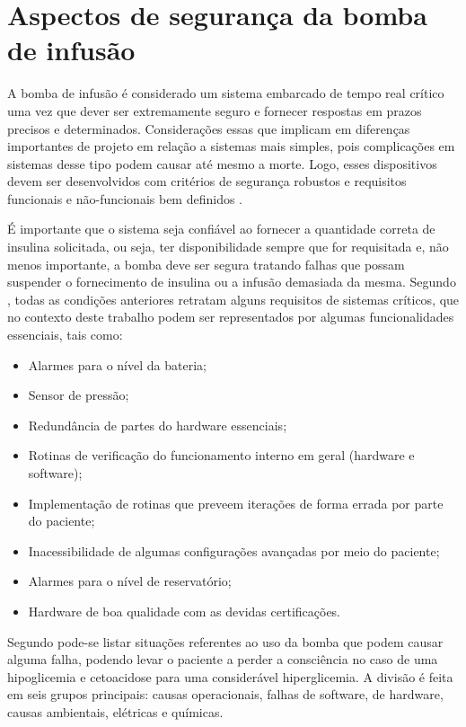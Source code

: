 \section{Aspectos de segurança da bomba de infusão}
A bomba de infusão é considerado um sistema embarcado de tempo real crítico uma vez que dever ser extremamente seguro e fornecer respostas em prazos precisos e determinados. Considerações essas que implicam em diferenças importantes de projeto em relação a sistemas mais simples, pois complicações em sistemas desse tipo podem causar até mesmo a morte. Logo, esses dispositivos devem ser desenvolvidos com critérios de segurança robustos e requisitos funcionais e não-funcionais bem definidos \cite{sommerville2004software}.

É importante que o sistema seja confiável ao fornecer a quantidade correta de insulina solicitada, ou seja, ter disponibilidade sempre que for requisitada e, não menos importante, a bomba deve ser segura tratando falhas que possam suspender o fornecimento de insulina ou a infusão demasiada da mesma. Segundo \cite{sommerville2004software}, todas as condições anteriores retratam alguns requisitos de sistemas críticos, que no contexto deste trabalho podem ser representados por algumas funcionalidades essenciais, tais como:

\begin{itemize}
\item Alarmes para o nível da bateria;
\item Sensor de pressão;
\item Redundância de partes do hardware essenciais;
\item Rotinas de verificação do funcionamento interno em geral (hardware e software);
\item Implementação de rotinas que preveem iterações de forma errada por parte do paciente;
\item Inacessibilidade de algumas configurações avançadas por meio do paciente;
\item Alarmes para o nível de reservatório;
\item Hardware de boa qualidade com as devidas certificações.
\end{itemize}

Segundo \cite{zhang2010hazard} pode-se listar situações referentes ao uso da bomba que podem causar alguma falha, podendo levar o paciente a perder a consciência no caso de uma hipoglicemia e cetoacidose para uma considerável hiperglicemia. A divisão é feita em seis grupos principais: causas operacionais, falhas de software, de hardware, causas ambientais, elétricas e químicas.

